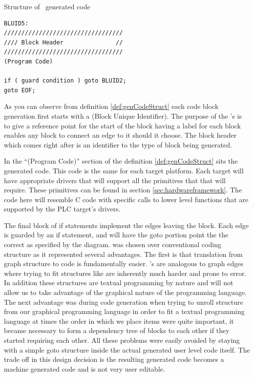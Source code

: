 \noindent\begin{minipage}{\textwidth}
\begin{definition}
\label{def:genCodeStruct}
Structure of \plcchart \  generated code

\begin{lstlisting}[frame=single]
BLUID5:
//////////////////////////////////
//// Block Header               //
//////////////////////////////////
(Program Code)

if ( guard condition ) goto BLUID2;
goto EOF;
\end{lstlisting}
\end{definition}
\end{minipage}

As you can observe from definition \ref{def:genCodeStruct} each code block generation first starts with a  (Block Unique Identifier). The purpose of the 's is to give a reference point for the start of the block having a  label for each block enables any block to connect an edge to it should it choose. The block header which comes right after is an identifier to the type of block being generated. 

In the ``(Program Code)'' section of the definition \ref{def:genCodeStruct} sits the generated  code. This code is the same for each target platform. Each  target will have appropriate drivers that will support all the primitives that that  will require. These primitives can be found in section \ref{sec:hardwareframework}. The code here will resemble C code with specific calls to lower level functions that are supported by the PLC target's drivers.

The final block of if statements implement the edges leaving the block. Each edge is guarded by an if statement, and will have the goto portion point the the correct  as specified by the diagram.  was chosen over conventional coding structure as it represented several advantages. The first is that translation from graph structure to code is fundamentally easier. 's are analogous to graph edges where trying to fit structures like   are inherently much harder and prone to error. In addition these structures are textual programming by nature and will not allow us to take advantage of the graphical nature of the programming language. The next advantage was during code generation when trying to unroll structure from our graphical programming language in order to fit a textual programming language at times the order in which we place items were quite important, it became necessary to form a dependency tree of blocks to each other if they started requiring each other. All these problems were easily avoided by staying with a simple goto structure inside the actual generated user level  code itself. The trade off in this design decision is the resulting generated code becomes a machine generated code and is not very user editable. 


